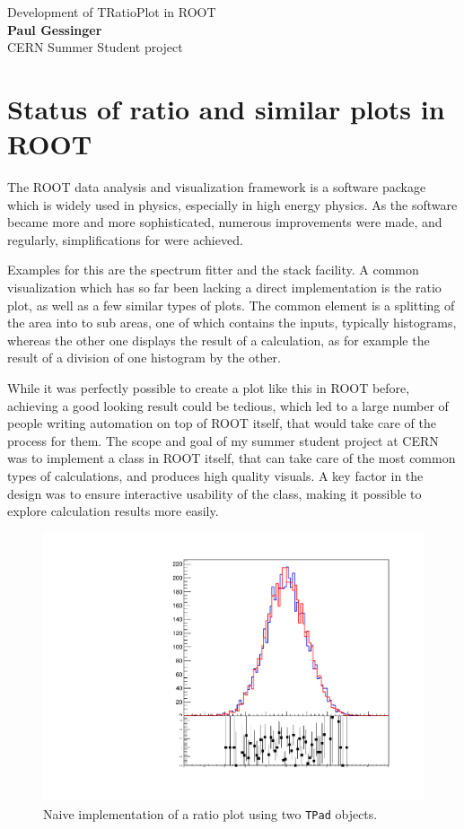 \begin{centering} 
  \huge Development of TRatioPlot in ROOT \\ 
  \large \textbf{Paul Gessinger} \\ 
  \large CERN Summer Student project \\ 
\end{centering} 
\vspace{1.0cm}
\normalsize

\section{Status of ratio and similar plots in ROOT}

\noindent The ROOT data analysis and visualization framework is a software package which
is widely used in physics, especially in high energy physics. As the software became more
and more sophisticated, numerous improvements were made, and regularly, simplifications
for were achieved. 

Examples for this are the spectrum fitter and the stack facility.
A common visualization which has so far been lacking a direct implementation is the
ratio plot, as well as a few similar types of plots. The common element is a splitting
of the area into to sub areas, one of which contains the inputs, typically histograms,
whereas the other one displays the result of a calculation, as for example the result 
of a division of one histogram by the other.

While it was perfectly possible to create a plot like this in ROOT before, achieving 
a good looking result could be tedious, which led to a large number of people writing
automation on top of ROOT itself, that would take care of the process for them. The scope
and goal of my summer student project at CERN was to implement a class in ROOT itself,
that can take care of the most common types of calculations, and produces high quality
visuals. A key factor in the design was to ensure interactive usability of the class,
making it possible to explore calculation results more easily.

\begin{figure}
  \centering
  \includegraphics[width=1.0\linewidth]{assets/bad.pdf}
  \caption{Naive implementation of a ratio plot using two \texttt{TPad} objects.}
  \label{fig:bad}
\end{figure}

